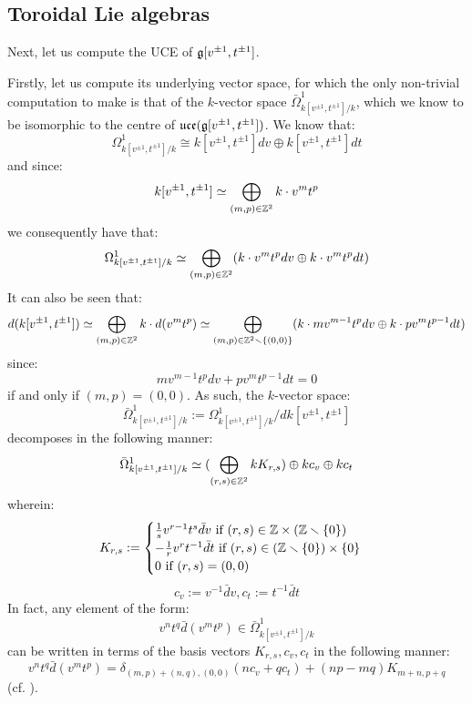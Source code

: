     \subsection{Toroidal Lie algebras}
        \begin{example} \label{example: toroidal_lie_algebras_centres}
            Next, let us compute the UCE of $\mathfrak{g}[v^{\pm 1}, t^{\pm 1}]$. 
            
            Firstly, let us compute its underlying vector space, for which the only non-trivial computation to make is that of the $k$-vector space $\bar{\Omega}^1_{k[v^{\pm 1}, t^{\pm 1}]/k}$, which we know to be isomorphic to the centre of $\mathfrak{uce}(\mathfrak{g}[v^{\pm 1}, t^{\pm 1}])$. We know that:
                $$\Omega^1_{k[v^{\pm 1}, t^{\pm 1}]/k} \cong k[v^{\pm 1}, t^{\pm 1}] dv \oplus k[v^{\pm 1}, t^{\pm 1}] dt$$
            and since:
                $$k[v^{\pm 1}, t^{\pm 1}] \simeq \bigoplus_{(m, p) \in \mathbb{Z}^2} k \cdot v^m t^p$$
            we consequently have that:
                $$\Omega^1_{k[v^{\pm 1}, t^{\pm 1}]/k} \simeq \bigoplus_{(m, p) \in \mathbb{Z}^2} (k \cdot v^m t^p dv \oplus k \cdot v^m t^p dt)$$
            It can also be seen that:
                $$d(k[v^{\pm 1}, t^{\pm 1}]) \simeq \bigoplus_{(m, p) \in \mathbb{Z}^2} k \cdot d(v^m t^p) \simeq \bigoplus_{(m, p) \in \mathbb{Z}^2 \smallsetminus \{(0, 0)\}} ( k \cdot m v^{m - 1} t^p dv \oplus k \cdot p v^m t^{p - 1} dt )$$
            since:
                $$m v^{m - 1} t^p dv + p v^m t^{p - 1} dt = 0$$
            if and only if $(m, p) = (0, 0)$. As such, the $k$-vector space:
                $$\bar{\Omega}^1_{k[v^{\pm 1}, t^{\pm 1}]/k} := \Omega^1_{k[v^{\pm 1}, t^{\pm 1}]/k}/d k[v^{\pm 1}, t^{\pm 1}]$$
            decomposes in the following manner:
                $$\bar{\Omega}^1_{k[v^{\pm 1}, t^{\pm 1}]/k} \simeq ( \bigoplus_{(r, s) \in \mathbb{Z}^2} k K_{r, s}) \oplus k c_v \oplus k c_t$$
            wherein:
                $$
                    K_{r, s} :=
                    \begin{cases}
                        \text{$\frac1s v^{r - 1} t^s \bar{d}v$ if $(r, s) \in \Z \x (\Z \setminus \{0\})$}
                        \\
                        \text{$-\frac1r v^r t^{-1} \bar{d}t$ if $(r, s) \in (\Z \setminus \{0\}) \x \{0\}$}
                        \\
                        \text{$0$ if $(r, s) = (0, 0)$}
                    \end{cases}
                $$
                $$c_v := v^{-1} \bar{d}v, c_t := t^{-1} \bar{d}t$$
            In fact, any element of the form:
                $$v^n t^q \bar{d}(v^m t^p) \in \bar{\Omega}^1_{k[v^{\pm 1}, t^{\pm 1}]/k}$$
            can be written in terms of the basis vectors $K_{r, s}, c_v, c_t$ in the following manner:
                $$v^n t^q \bar{d}(v^m t^p) = \delta_{(m, p) + (n, q), (0, 0)} ( n c_v + q c_t ) + (np - mq) K_{m + n, p + q}$$
            (cf. \cite[p. 35]{wendlandt_formal_shift_operators_on_yangian_doubles}).


\end{example}
